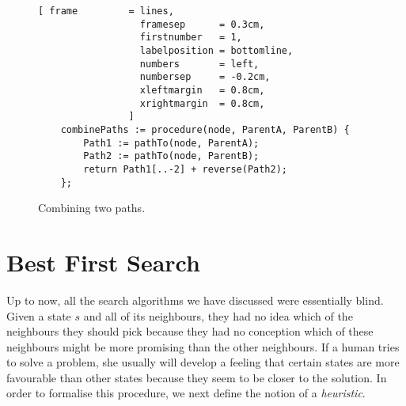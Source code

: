 \begin{figure}[!ht]
\centering
\begin{Verbatim}[ frame         = lines, 
                  framesep      = 0.3cm, 
                  firstnumber   = 1,
                  labelposition = bottomline,
                  numbers       = left,
                  numbersep     = -0.2cm,
                  xleftmargin   = 0.8cm,
                  xrightmargin  = 0.8cm,
                ]
    combinePaths := procedure(node, ParentA, ParentB) {
        Path1 := pathTo(node, ParentA);
        Path2 := pathTo(node, ParentB);
        return Path1[..-2] + reverse(Path2);
    };
\end{Verbatim}
\vspace*{-0.3cm}
\caption{Combining two paths.}
\label{fig:combine-paths.stlx}
\end{figure}
\pagebreak

\section{Best First Search}
Up to now, all the search algorithms we have discussed were essentially blind.  Given a state $s$ and
all of its neighbours, they had no idea which of the neighbours they should pick because they had no conception
which of these neighbours might be more promising than the other neighbours.  If a human tries to solve a
problem, she usually will develop a feeling that certain states are more favourable than other states because
they seem to be closer to the solution.  In order to formalise this procedure, we next define the notion of a 
\emph{\color{blue}heuristic}.
\pagebreak

